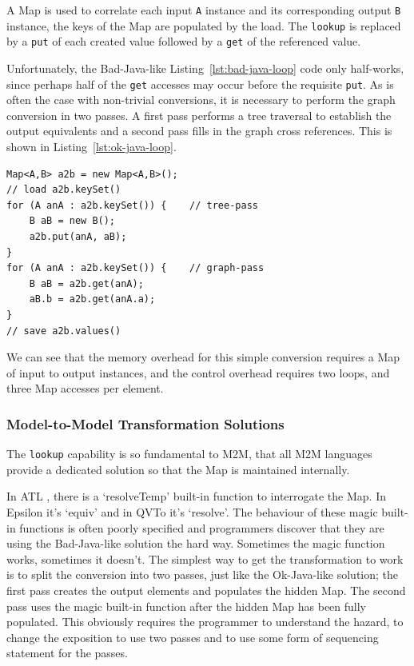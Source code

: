 \documentclass{jot}
\begin{document}
A Map is used to correlate each input \verb|A| instance and its corresponding output \verb|B| instance, the keys of the Map are populated by the load. The \verb|lookup| is replaced by a \verb|put| of each created value followed by a \verb|get| of the referenced value.

Unfortunately, the Bad-Java-like Listing~\ref{lst:bad-java-loop} code only half-works, since perhaps half of the \verb|get| accesses may occur before the requisite \verb|put|. As is often the case with non-trivial conversions, it is necessary to perform the graph conversion in two passes. A first pass performs a tree traversal to establish the output equivalents and a second pass fills in the graph cross references. This is shown in Listing~\ref{lst:ok-java-loop}.

\begin{lstlisting}[label=lst:ok-java-loop,caption=Ok-Java-like Example Conversion 		Loop,captionpos=b]
Map<A,B> a2b = new Map<A,B>();
// load a2b.keySet()
for (A anA : a2b.keySet()) {    // tree-pass
    B aB = new B();
    a2b.put(anA, aB);
}
for (A anA : a2b.keySet()) {    // graph-pass
    B aB = a2b.get(anA);
    aB.b = a2b.get(anA.a);
}
// save a2b.values()
\end{lstlisting}

We can see that the memory overhead for this simple conversion requires a Map of input to output instances, and the control overhead requires two loops, and three Map accesses per element.

\subsubsection{Model-to-Model Transformation Solutions}

The \verb|lookup| capability is so fundamental to M2M, that all M2M languages provide a dedicated solution so that the Map is maintained internally.

In ATL \cite{Eclipse-ATL}, there is a `resolveTemp' built-in function to interrogate the Map. In Epsilon \cite{Eclipse-Epsilon} it's `equiv' and in QVTo it's `resolve'. The behaviour of these magic built-in functions is often poorly specified and programmers discover that they are using the Bad-Java-like solution the hard way. Sometimes the magic function works, sometimes it doesn't. The simplest way to get the transformation to work is to split the conversion into two passes, just like the Ok-Java-like solution; the first pass creates the output elements and populates the hidden Map. The second pass uses the magic built-in function after the hidden Map has been fully populated. This obviously requires the programmer to understand the hazard, to change the exposition to use two passes and to use some form of sequencing statement for the passes.
\end{document}
